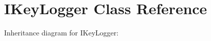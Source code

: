 \hypertarget{class_i_key_logger}{}\section{I\+Key\+Logger Class Reference}
\label{class_i_key_logger}


Inheritance diagram for I\+Key\+Logger\+:
